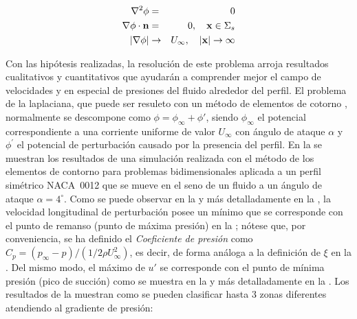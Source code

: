 \begin{eqnarray}
\nabla^{2} \phi & = & 0 \\
\nabla \phi \cdot \mathbf{n} & = & 0, \quad \mathbf{x} \in \Sigma_{s}\\
\left|\nabla \phi \right| & \rightarrow & U_{\infty}, \quad \left|\mathbf{x}\right| \rightarrow \infty
\LABEQ{problemaContorno}
\end{eqnarray}


Con las hipótesis realizadas, la resolución de este problema arroja resultados cualitativos y cuantitativos que ayudarán a comprender mejor el campo de velocidades y en especial de presiones del fluido alrededor del perfil. El problema de la laplaciana, que puede ser resuleto con un método de elementos de cotorno%
, normalmente se descompone como $\phi = \phi_{\infty} + \phi'$, siendo $\phi_{\infty}$ el potencial correspondiente a una corriente uniforme de valor $U_{\infty}$ con ángulo de ataque $\alpha$ y $\phi^{'}$ el potencial de perturbación causado por la presencia del perfil. En la  se muestran los resultados de una simulación realizada con el método de los elementos de contorno para problemas bidimensionales aplicada a un perfil simétrico NACA~0012 que se mueve en el seno de un fluido a un ángulo de ataque $\alpha = 4^{\circ}$. Como se puede observar en la  y más detalladamente en la , la velocidad longitudinal de perturbación posee un mínimo que se corresponde con el punto de remanso (punto de máxima presión) en la ; nótese que, por conveniencia, se ha definido el \emph{Coeficiente de presión} como $C_{p} = \left(p_{\infty} - p\right)/\left(1/2\rho U_{\infty}^{2}\right)$, es decir, de forma análoga a la definición de $\xi$ en la . Del mismo modo, el máximo de $u'$ se corresponde con el punto de mínima presión (pico de succión) como se muestra en la  y más detalladamente en la . Los resultados de la  muestran como se pueden clasificar hasta 3 zonas diferentes atendiendo al gradiente de presión:

